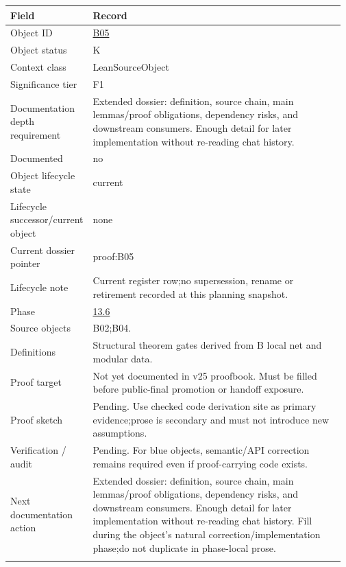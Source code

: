 \begin{longtable}{L{0.16\linewidth} L{0.81\linewidth}}
\hline
\textbf{Field} & \textbf{Record}\\
\hline
Object ID & \hyperlink{object-row-B05}{B05}\\
\hline\addlinespace[0.20em]
Object status & K\\
\hline\addlinespace[0.20em]
Context class & LeanSourceObject\\
\hline\addlinespace[0.20em]
Significance tier & F1\\
\hline\addlinespace[0.20em]
Documentation depth requirement & Extended dossier: definition, source chain, main lemmas/\allowbreak{}proof obligations, dependency risks, and downstream consumers. Enough detail for later implementation without re-reading chat history.\\
\hline\addlinespace[0.20em]
Documented & no\\
\hline\addlinespace[0.20em]
Object lifecycle state & current\\
\hline\addlinespace[0.20em]
Lifecycle successor/\allowbreak{}current object & none\\
\hline\addlinespace[0.20em]
Current dossier pointer & proof:B05\\
\hline\addlinespace[0.20em]
Lifecycle note & Current register row;\newline no supersession, rename or retirement recorded at this planning snapshot.\\
\hline\addlinespace[0.20em]
Phase & \hyperlink{phase-row-13-6}{13.6}\\
\hline\addlinespace[0.20em]
Source objects & B02;\newline B04.\\
\hline\addlinespace[0.20em]
Definitions & Structural theorem gates derived from B local net and modular data.\\
\hline\addlinespace[0.20em]
Proof target & Not yet documented in v25 proofbook. Must be filled before public-final promotion or handoff exposure.\\
\hline\addlinespace[0.20em]
Proof sketch & Pending. Use checked code derivation site as primary evidence;\newline prose is secondary and must not introduce new assumptions.\\
\hline\addlinespace[0.20em]
Verification /\allowbreak{} audit & Pending. For blue objects, semantic/\allowbreak{}API correction remains required even if proof-carrying code exists.\\
\hline\addlinespace[0.20em]
Next documentation action & Extended dossier: definition, source chain, main lemmas/\allowbreak{}proof obligations, dependency risks, and downstream consumers. Enough detail for later implementation without re-reading chat history. Fill during the object's natural correction/\allowbreak{}implementation phase;\newline do not duplicate in phase-local prose.\\
\hline\addlinespace[0.20em]
\end{longtable}
